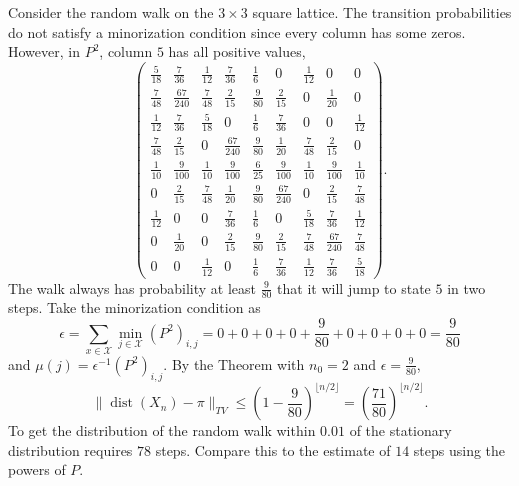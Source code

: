 \documentclass[12pt]{article}
\begin{document}
\begin{example}
    Consider the random walk on the \( 3 \times 3 \) square lattice.
    The transition probabilities do not satisfy a minorization condition
    since every column has some zeros.  However, in \( P^2 \), column $5$
    has all positive values,
    \[
        \begin{pmatrix}
            \frac{5}{18} & \frac{7}{36} & \frac{1}{12} & \frac{7}{36} &
            \frac{1}{6} & 0 & \frac{1}{12} & 0 & 0\\
            \frac{7}{48} & \frac{67}{240} & \frac{7}{48} & \frac{2}{15}
            & \frac{9}{80} & \frac{2}{15} & 0 & \frac{1}{20} & 0\\
            \frac{1}{12} & \frac{7}{36} & \frac{5}{18} & 0 & \frac{1}{6}
            & \frac{7}{36} & 0 & 0 & \frac{1}{12}\\
            \frac{7}{48} & \frac{2}{15} & 0 & \frac{67}{240} & \frac{9}{80}
            & \frac{1}{20} & \frac{7}{48} & \frac{2}{15} & 0\\
            \frac{1}{10} & \frac{9}{100} & \frac{1}{10} & \frac{9}{100}
            & \frac{6}{25} & \frac{9}{100} & \frac{1}{10} & \frac{9}{100}
            & \frac{1}{10}\\
            0 & \frac{2}{15} & \frac{7}{48} & \frac{1}{20} & \frac{9}{80}
            & \frac{67}{240} & 0 & \frac{2}{15} & \frac{7}{48}\\
            \frac{1}{12} & 0 & 0 & \frac{7}{36} & \frac{1}{6} & 0 &
            \frac{5}{18} & \frac{7}{36} & \frac{1}{12}\\
            0 & \frac{1}{20} & 0 & \frac{2}{15} & \frac{9}{80} & \frac{2}
            {15} & \frac{7}{48} & \frac{67}{240} & \frac{7}{48}\\
            0 & 0 & \frac{1}{12} & 0 & \frac{1}{6} & \frac{7}{36} &
            \frac{1}{12} & \frac{7}{36} & \frac{5}{18}
        \end{pmatrix}
        .
    \] The walk always has probability at least \( \frac{9}{80} \) that
    it will jump to state \( 5 \) in two steps.  Take the minorization
    condition as
    \[
        \epsilon = \sum_{x \in \mathcal{X}} \min_{j \in \mathcal{X}} (P^2)_
        {i,j} = 0 + 0 + 0 + 0 + \frac{9}{80} + 0 + 0 + 0 + 0 = \frac{9}{80}
    \] and \( \mu(j) = \epsilon^{-1} (P^2)_{i,j} \).  By the Theorem
    with \( n_0 = 2 \) and \( \epsilon = \frac{9}{80} \),
    \[
        \|
        \operatorname{dist}
        (X_n) - \pi \|_{TV} \le (1-\frac{9}{80})^{\lfloor n/2 \rfloor} =
        \left( \frac{71}{80} \right)^{\lfloor n/2 \rfloor}.
    \] To get the distribution of the random walk within \( 0.01 \) of
    the stationary distribution requires \( 78 \) steps.  Compare this
    to the estimate of \( 14 \) steps using the powers of \( P \).
\end{example}
\end{document}

